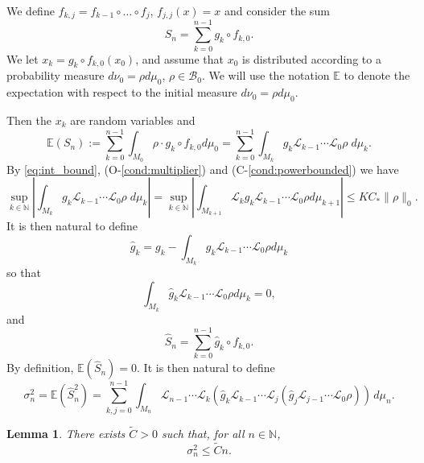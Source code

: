 \documentclass{amsart}
\numberwithin{equation}{section}
\newtheorem{lem}[thm]{Lemma}
\newcommand\cB{{\mathcal B}}
\newcommand\cL{{\mathcal L}}
\newcommand\bE{{\mathbb E}}
\newcommand\bN{{\mathbb N}}
\newcommand{\hS}{\hat{S}}
\begin{document}
\smallskip
We define $f_{k,j}=f_{k-1}\circ \dots \circ f_j$, $f_{j,j}(x)=x$ and consider the sum
\[
S_n =\sum_{k=0}^{n-1} g_k\circ f_{k,0}.
\]
We let $x_k=g_k\circ f_{k,0}(x_0)$, and assume that $x_0$ is distributed according to a probability measure $d\nu_0 = \rho d\mu_0$, 
$\rho\in \cB_0$.
We will use the notation $\bE$ to denote the expectation with respect to the initial measure $d\nu_0= \rho d\mu_0$.

Then the $x_k$ are random variables and
\[
\bE\left(S_n\right):=\sum_{k=0}^{n-1}\int_{M_0} \rho \cdot g_k\circ f_{k,0} d\mu_0
= \sum_{k=0}^{n-1}\int_{M_k} g_k \cL_{k-1}\cdots \cL_0 \rho\; d\mu_k.
\]
By \eqref{eq:int_bound}, (O-\ref{cond:multiplier}) and (C-\ref{cond:powerbounded}) we have
\[
\sup_{k\in\bN}\left|\int_{M_k} g_k \cL_{k-1}\cdots \cL_0 \rho\; d\mu_k\right|=\sup_{k\in\bN}\left|\int_{M_{k+1}} \cL_k g_k \cL_{k-1}\cdots \cL_0 \rho d\mu_{k+1}\right|\leq K C_*\|\rho\|_0.
\]
It is then natural to define
\begin{equation}\label{eq:centering0}
\hat g_k=g_k-\int_{M_k} g_k \cL_{k-1}\cdots \cL_0 \rho d\mu_k
\end{equation}
so that
\begin{equation}\label{eq:centering}
\int_{M_k} \hat g_k \cL_{k-1}\cdots \cL_0 \rho d\mu_k=0,
\end{equation}
and
\begin{equation}
\label{eq:center sum}
\hS_n  =\sum_{k=0}^{n-1} \hat g_k\circ f_{k,0}.
\end{equation}
By definition, $\bE\left(\hS_n\right)=0$. It is then natural to define
\begin{equation}\label{eq:variance0}
\sigma_n^2=\bE(\hS_n^2)= \sum_{k,j=0}^{n-1} \int_{M_{n}}\cL_{n-1}\cdots\cL_{k}(\hat g_{k}\cL_{k-1}\cdots \cL_{j}(\hat g_j\cL_{j-1}\cdots \cL_{0}\rho)) \, d\mu_n.
\end{equation}
\begin{lem}\label{lem:variance_up}
There exists $\tilde{C}>0$ such that, for all $n\in\bN$,
\[
\sigma_n^2\le \tilde{C} n.
\]
\end{lem}
\end{document}
